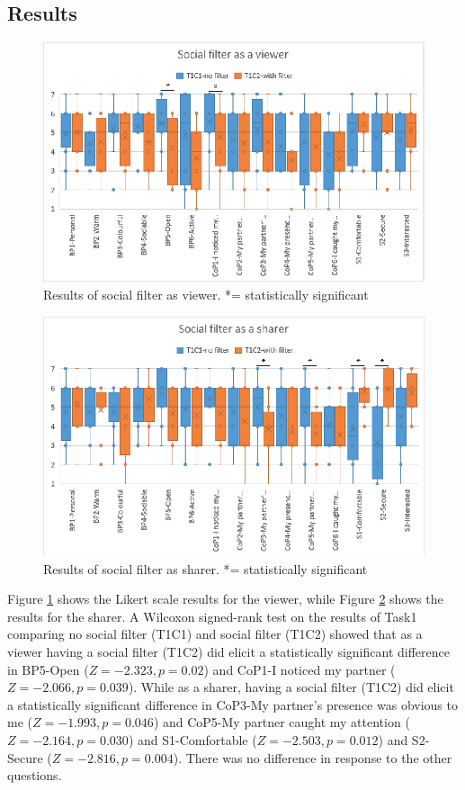 \subsection{Results}

\begin{figure}
\begin{center}
\includegraphics[width=0.8\linewidth]{images/frontier18/images-03.eps}
\caption{Results of social filter as viewer. *= statistically significant}\label{fig:frontier18:result-filter-viewer}
\end{center}
\end{figure}

\begin{figure}
\begin{center}
\includegraphics[width=0.8\linewidth]{images/frontier18/images-04.eps}
\caption{Results of social filter as sharer. *= statistically significant}\label{fig:frontier18:result-filter-sharer}
\end{center}
\end{figure}

Figure \ref{fig:frontier18:result-filter-viewer} shows the Likert scale results for the viewer, while Figure \ref{fig:frontier18:result-filter-sharer} shows the results for the sharer. A Wilcoxon signed-rank test on the results of Task1 comparing no social filter (T1C1) and social filter (T1C2) showed that as a viewer having a social filter (T1C2) did elicit a statistically significant difference in BP5-Open ($Z=-2.323, p=0.02$) and CoP1-I noticed my partner ($Z=-2.066, p=0.039$). While as a sharer, having a social filter (T1C2) did elicit a statistically significant difference in CoP3-My partner's presence was obvious to me ($Z=-1.993, p=0.046$) and CoP5-My partner caught my attention ($Z=-2.164, p=0.030$) and S1-Comfortable ($Z=-2.503, p=0.012$) and S2-Secure ($Z=-2.816, p=0.004$). There was no difference in response to the other questions.

